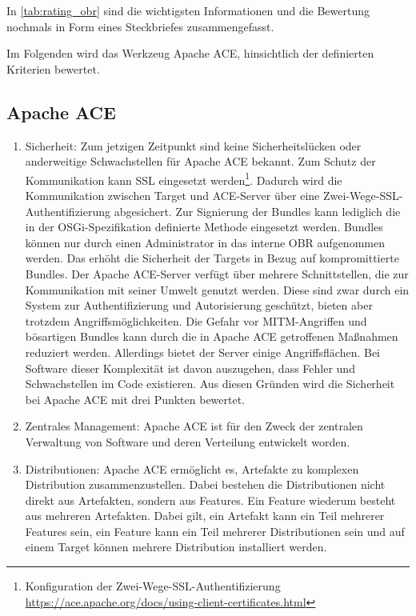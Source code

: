 In \autoref{tab:rating_obr} sind die wichtigsten Informationen und die Bewertung nochmals in Form eines Steckbriefes zusammengefasst.



Im Folgenden wird das Werkzeug Apache ACE, hinsichtlich der definierten Kriterien bewertet.

\subsection{Apache ACE}

\begin{enumerate}[label={Nr. \arabic*}, leftmargin=*, labelindent=1em]
 \item Sicherheit:
 Zum jetzigen Zeitpunkt sind keine Sicherheitslücken oder anderweitige Schwachstellen für Apache ACE bekannt.
 Zum Schutz der Kommunikation kann \ac{SSL} eingesetzt werden\footnote{Konfiguration der Zwei-Wege-SSL-Authentifizierung \url{https://ace.apache.org/docs/using-client-certificates.html}}.
 Dadurch wird die Kommunikation zwischen Target und ACE-Server über eine Zwei-Wege-\ac{SSL}-Authentifizierung abgesichert.
 Zur Signierung der Bundles kann lediglich die in der \ac{OSGi}-Spezifikation definierte Methode eingesetzt werden. 
 Bundles können nur durch einen Administrator in das interne \ac{OBR} aufgenommen werden. Das erhöht die Sicherheit der Targets in Bezug auf 
 kompromittierte Bundles. Der Apache ACE-Server verfügt über mehrere Schnittstellen, die zur Kommunikation mit seiner Umwelt genutzt werden.
 Diese sind zwar durch ein System zur Authentifizierung und Autorisierung geschützt, bieten aber trotzdem Angriffsmöglichkeiten.
 Die Gefahr vor \ac{MITM}-Angriffen und bösartigen Bundles kann durch die in Apache ACE getroffenen Maßnahmen reduziert werden. Allerdings
 bietet der Server einige Angriffsflächen. Bei Software dieser Komplexität ist davon auszugehen, dass Fehler und Schwachstellen im Code existieren.
 Aus diesen Gründen wird die Sicherheit bei Apache ACE mit drei Punkten bewertet.
 
 \item Zentrales Management: 
 Apache ACE ist für den Zweck der zentralen Verwaltung von Software und deren Verteilung entwickelt worden. 
 
 \item Distributionen:
 Apache ACE ermöglicht es, Artefakte zu komplexen Distribution zusammenzustellen. Dabei bestehen die Distributionen nicht direkt aus Artefakten, sondern aus Features.
 Ein Feature wiederum besteht aus mehreren Artefakten. Dabei gilt, ein Artefakt kann ein Teil mehrerer Features sein, ein Feature kann ein Teil mehrerer Distributionen sein und 
 auf einem Target können mehrere Distribution installiert werden.
 

\end{enumerate}
